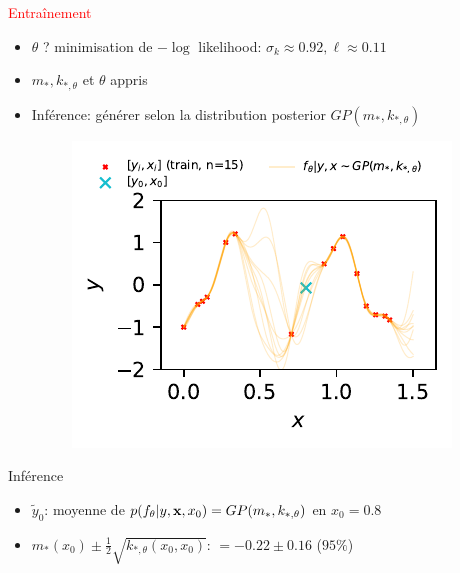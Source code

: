\documentclass[xcolor=svgnames, t]{beamer}
\newcommand{\vectorx}[1]{\boldsymbol{\MakeLowercase{\mathbf{#1}}}}
\newcommand{\tored}[1]{\textcolor{red}{#1}}
\newcommand{\toblue}[1]{\textcolor{internationalblue}{#1}}
\begin{document}
\begin{frame}{\subsecname}
  \tored{Entraînement}
  \begin{itemize}
    \item<1-> $\theta$ ? minimisation de $-\log$ likelihood: $\sigma_k \approx 0.92, \ell \approx 0.11$
    \item<2-> $m_{*}, k_{*, \theta}$ et $\theta$ appris
    \item<3-> \toblue{Inférence}: générer selon la distribution posterior $GP( m_{*}, k_{*, \theta} )$
      \begin{figure}
        \includegraphics{gp_1D_example_noisefree_pred.pdf}
      \end{figure}
  \end{itemize}
\end{frame}

\begin{frame}{\subsecname}
  \toblue{}{Inférence}
  \begin{itemize}
    \item $\tilde{y}_0$: moyenne de $p(f_\theta | y, \vectorx{x}, x_0) = GP(m_{*}, k_{*, \theta})$ en $x_0 =0.8$
    \item $m_{*}(x_0) \pm \frac{1}{2} \sqrt{k_{*, \theta}(x_0, x_0)}$: $ = -0.22 \pm 0.16$ ($95\%$)
  \end{itemize}
\end{frame}
\end{document}
